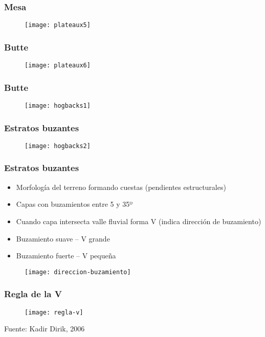\documentclass[14pt]{beamer}
\begin{document}
  \begin{frame}
\frametitle{Mesa}
 \begin{figure}
    \centering
    \texttt{[image: plateaux5]}
  \end{figure}
\end{frame}
  \begin{frame}
\frametitle{Butte}
 \begin{figure}
    \centering
    \texttt{[image: plateaux6]}
  \end{figure}
\end{frame}
  \begin{frame}
\frametitle{Butte}
 \begin{figure}
    \centering
    \texttt{[image: hogbacks1]}
  \end{figure}
\end{frame}
  \begin{frame}
\frametitle{Estratos buzantes}
 \begin{figure}
    \centering
    \texttt{[image: hogbacks2]}
  \end{figure}
\end{frame}
  \begin{frame}
\frametitle{Estratos buzantes}
\scriptsize{
\begin{itemize}
\item Morfología del terreno formando cuestas (pendientes estructurales) 
\item Capas con buzamientos entre 5 y 35º
\item Cuando capa intersecta valle fluvial forma V (indica dirección de buzamiento)
\item Buzamiento suave – V grande
\item Buzamiento fuerte – V pequeña
\end{itemize}
}
 \begin{figure}
    \centering
    \texttt{[image: direccion-buzamiento]}
  \end{figure}
\end{frame}
  \begin{frame}
\frametitle{Regla de la V}
 \begin{figure}
    \centering
    \texttt{[image: regla-v]}
  \end{figure}
  \tiny{Fuente: Kadir Dirik, 2006}
\end{frame}
\end{document}
